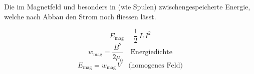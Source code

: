 \begin{runintext}
Die im Magnetfeld und besonders in  (wie Spulen) zwischengespeicherte Energie, welche nach Abbau den Strom noch fliessen lässt.
\end{runintext}
\begin{formulabox}
\[ E_{\mathrm{mag}} = \frac{1}{2}\,L\,I^2 \]
\formulasep
\[ w_{\mathrm{mag}} = \frac{B^2}{2\mu_0} \quad \text{Energiedichte} \]
\[ E_{\mathrm{mag}} = w_{\mathrm{mag}}\,V \quad \text{(homogenes Feld)} \]
\end{formulabox}

